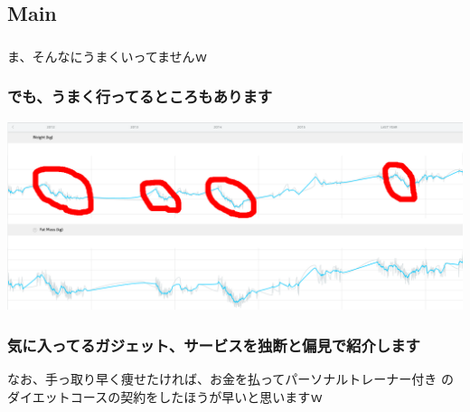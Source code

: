 \documentclass[aspectratio=169,11pt,hyperref={colorlinks=true}]{beamer}
\begin{document}
\subsection{Main}
\begin{frame}
  \frametitle{}
  \Huge{ま、そんなにうまくいってませんｗ}
\end{frame}

\begin{frame}
  \frametitle{でも、うまく行ってるところもあります}
  \begin{center}
    \includegraphics[width=1.0\textwidth]{my_weight_2.png}
  \end{center}
\end{frame}

\begin{frame}
  \frametitle{気に入ってるガジェット、サービスを独断と偏見で紹介します}
  なお、手っ取り早く痩せたければ、お金を払ってパーソナルトレーナー付き
  のダイエットコースの契約をしたほうが早いと思いますｗ
\end{frame}
\end{document}
